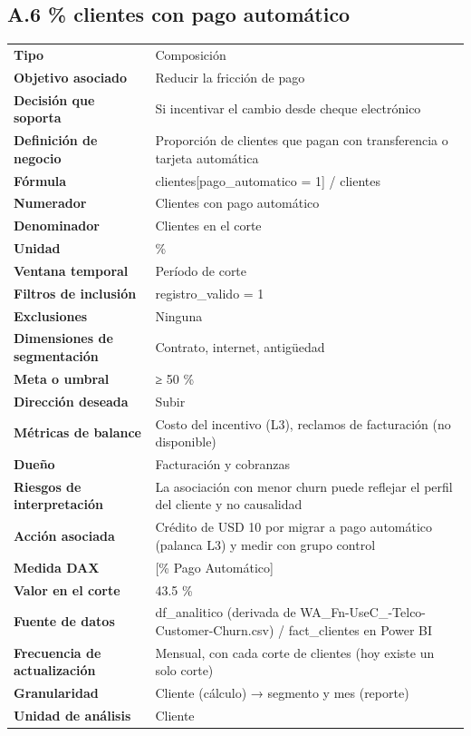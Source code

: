 \subsection*{A.6 \% clientes con pago automático}
\begin{footnotesize}
\begin{longtable}{@{}p{}p{}@{}}
\toprule
\textbf{Tipo} & Composición \\
\textbf{Objetivo asociado} & Reducir la fricción de pago \\
\textbf{Decisión que soporta} & Si incentivar el cambio desde cheque electrónico \\
\textbf{Definición de negocio} & Proporción de clientes que pagan con transferencia o tarjeta automática \\
\textbf{Fórmula} & clientes[pago\_automatico = 1] / clientes \\
\textbf{Numerador} & Clientes con pago automático \\
\textbf{Denominador} & Clientes en el corte \\
\textbf{Unidad} & \% \\
\textbf{Ventana temporal} & Período de corte \\
\textbf{Filtros de inclusión} & registro\_valido = 1 \\
\textbf{Exclusiones} & Ninguna \\
\textbf{Dimensiones de segmentación} & Contrato, internet, antigüedad \\
\textbf{Meta o umbral} & ≥ 50 \% \\
\textbf{Dirección deseada} & Subir \\
\textbf{Métricas de balance} & Costo del incentivo (L3), reclamos de facturación (no disponible) \\
\textbf{Dueño} & Facturación y cobranzas \\
\textbf{Riesgos de interpretación} & La asociación con menor churn puede reflejar el perfil del cliente y no causalidad \\
\textbf{Acción asociada} & Crédito de USD 10 por migrar a pago automático (palanca L3) y medir con grupo control \\
\textbf{Medida DAX} & [\% Pago Automático] \\
\textbf{Valor en el corte} & 43.5 \% \\
\textbf{Fuente de datos} & df\_analitico (derivada de WA\_Fn-UseC\_-Telco-Customer-Churn.csv) / fact\_clientes en Power BI \\
\textbf{Frecuencia de actualización} & Mensual, con cada corte de clientes (hoy existe un solo corte) \\
\textbf{Granularidad} & Cliente (cálculo) → segmento y mes (reporte) \\
\textbf{Unidad de análisis} & Cliente \\
\bottomrule
\end{longtable}
\end{footnotesize}

